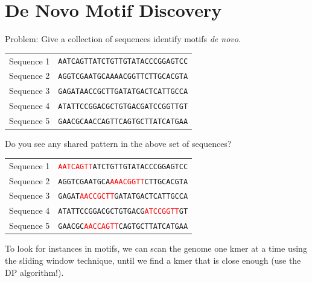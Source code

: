 \documentclass[10pt]{article}
\begin{document}
\section*{De Novo Motif Discovery}
Problem: Give a collection of sequences identify motifs \textit{de novo}.
\begin{center}
    \begin{tabular}{cc}
        Sequence 1 & \texttt{AATCAGTTATCTGTTGTATACCCGGAGTCC}\\
        Sequence 2 & \texttt{AGGTCGAATGCAAAACGGTTCTTGCACGTA}\\
        Sequence 3 & \texttt{GAGATAACCGCTTGATATGACTCATTGCCA}\\
        Sequence 4 & \texttt{ATATTCCGGACGCTGTGACGATCCGGTTGT}\\
        Sequence 5 & \texttt{GAACGCAACCAGTTCAGTGCTTATCATGAA}
    \end{tabular}
\end{center}
Do you see any shared pattern in the above set of sequences?
\begin{center}
    \begin{tabular}{cc}
        Sequence 1 & \texttt{\textcolor{red}{AATCAGTT}ATCTGTTGTATACCCGGAGTCC}\\
        Sequence 2 & \texttt{AGGTCGAATGCA\textcolor{red}{AAACGGTT}CTTGCACGTA}\\
        Sequence 3 & \texttt{GAGAT\textcolor{red}{AACCGCTT}GATATGACTCATTGCCA}\\
        Sequence 4 & \texttt{ATATTCCGGACGCTGTGACG\textcolor{red}{ATCCGGTT}GT}\\
        Sequence 5 & \texttt{GAACGC\textcolor{red}{AACCAGTT}CAGTGCTTATCATGAA}
    \end{tabular}
\end{center}
To look for instances in motifs, we can scan the genome one kmer at a time using the sliding window technique, until we find a kmer that is close enough (use the DP algorithm!).
\end{document}
